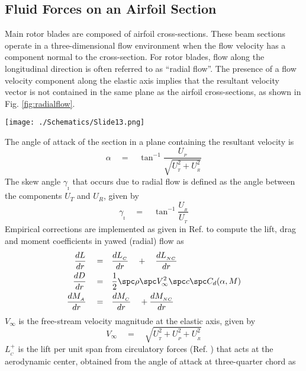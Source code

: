 \subsection*{\textbf{Fluid Forces on an Airfoil Section}}
Main rotor blades are composed of airfoil cross-sections. These beam sections operate in a three-dimensional flow environment when the flow velocity has a component normal to the cross-section. For rotor blades, flow along the longitudinal direction is often referred to as ``radial flow''. The presence of a flow velocity component along the elastic axis implies that the resultant velocity vector is not contained in the same plane as the airfoil cross-sections, as shown in Fig. \ref{fig:radialflow}. 
\begin{Figure}
 \centering
 \texttt{[image: ./Schematics/Slide13.png]}
 \vspace{-0.5cm}
 \label{fig:radialflow}
\end{Figure}
\vspace{0.5cm}
The angle of attack of the section in a plane containing the resultant velocity is 
\begin{equation}
\alpha \quad = \quad \tan^{-1} \frac{U_{_P}}{\sqrt{U_{_T}^2 + U_{_R}^2}} 
\end{equation}
The skew angle $\gamma_{_\textrm{I}}$ that occurs due to radial flow is defined as the angle between the components $U_T$ and $U_R$, given by 
\[\gamma_{_\textrm{I}} \quad = \quad \tan^{-1}\frac{U_{_R}}{U_{_T}}  \]
Empirical corrections are implemented as given in Ref. \cite{Johnson} to compute the lift, drag and moment coefficients in yawed (radial) flow as
\begin{equation}
\begin{aligned}
\frac{dL}{dr} \quad = \quad & \frac{d L_{_C}}{dr} \quad + \quad \frac{d L_{_{NC}}}{dr} \\
\frac{dD}{dr} \quad = \quad & \frac{1}{2} \spc \rho \spc V_\infty^2 \spc c \spc C_d(\alpha,M) \\
\frac{dM_{_A}}{dr} \quad = \quad & \frac{d M_{_C}}{dr} \quad + \frac{d M_{_{NC}}}{dr} \\ 
\end{aligned}
\end{equation}
$V_\infty$ is the free-stream velocity magnitude at the elastic axis, given by 
\[V_\infty \quad = \quad \sqrt{U_{_T}^2+U_{_P}^2+U_{_R}^2} \]
$L_{_C}^+$ is the lift per unit span from circulatory forces (Ref. \cite{Leishman1}) that acts at the aerodynamic center, obtained from the angle of attack at three-quarter chord as 
